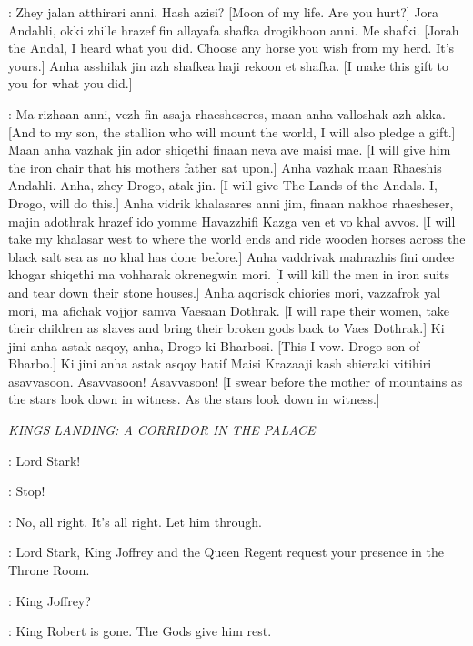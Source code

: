 \DROGO: Zhey jalan atthirari anni. Hash azisi? [Moon of my life. Are you hurt?] Jora Andahli, okki zhille hrazef fin allayafa shafka drogikhoon anni. Me shafki. [Jorah the Andal, I heard what you did. Choose any horse you wish from my herd. It's yours.] Anha asshilak jin azh shafkea haji rekoon et shafka. [I make this gift to you for what you did.]


\DROGO: Ma rizhaan anni, vezh fin asaja rhaesheseres, maan anha valloshak azh akka. [And to my son, the stallion who will mount the world, I will also pledge a gift.] Maan anha vazhak jin ador shiqethi finaan neva ave maisi mae. [I will give him the iron chair that his mothers father sat upon.] Anha vazhak maan Rhaeshis Andahli. Anha, zhey Drogo, atak jin. [I will give The Lands of the Andals. I, Drogo, will do this.] Anha vidrik khalasares anni jim, finaan nakhoe rhaesheser, majin adothrak hrazef ido yomme Havazzhifi Kazga ven et vo khal avvos. [I will take my khalasar west to where the world ends and ride wooden horses across the black salt sea as no khal has done before.] Anha vaddrivak mahrazhis fini ondee khogar shiqethi ma vohharak okrenegwin mori. [I will kill the men in iron suits and tear down their stone houses.] Anha aqorisok chiories mori, vazzafrok yal mori, ma afichak vojjor samva Vaesaan Dothrak. [I will rape their women, take their children as slaves and bring their broken gods back to Vaes Dothrak.] Ki jini anha astak asqoy, anha, Drogo ki Bharbosi. [This I vow. Drogo son of Bharbo.] Ki jini anha astak asqoy hatif Maisi Krazaaji kash shieraki vitihiri asavvasoon. Asavvasoon! Asavvasoon! [I swear before the mother of mountains as the stars look down in witness. As the stars look down in witness.] 


\scene

\textit{KINGS LANDING: A CORRIDOR IN THE PALACE} 


\PAGE:  Lord Stark!

\BANNERMAN: Stop! 

\NED: No, all right. It's all right. Let him through. 

\PAGE: Lord Stark, King Joffrey and the Queen Regent request your presence in the Throne Room. 

\NED: King Joffrey? 

\PAGE: King Robert is gone. The Gods give him rest. 


